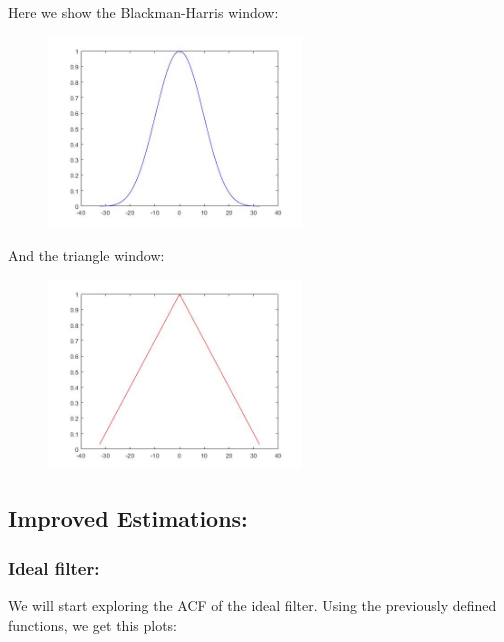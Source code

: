 \documentclass[a4paper,11pt]{article}
\begin{document}
Here we show the Blackman-Harris window:

\begin{figure}[!hp]
    \begin{center}
    \includegraphics[width=0.6\textwidth]{images/lab2_figure11.jpg}
    \end{center}
\end{figure}

And the triangle window:

\begin{figure}[!hp]
    \begin{center}
    \includegraphics[width=0.6\textwidth]{images/lab2_figure13.jpg}
    \end{center}
\end{figure}

\subsection{Improved Estimations:}

\subsubsection{Ideal filter:}

We will start exploring the ACF of the ideal filter. Using the previously defined functions, we get this plots:
\end{document}
